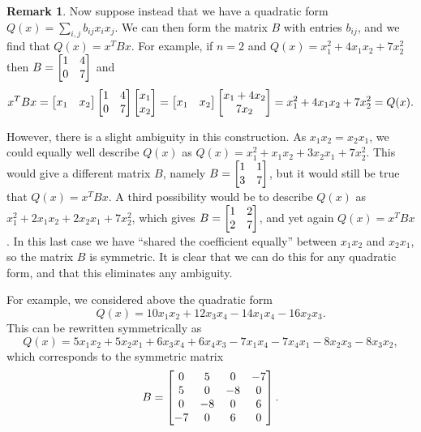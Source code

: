 \documentclass[reqno]{amsart}
\theoremstyle{definition}
\newtheorem{remark}[theorem]{Remark}
\begin{document}
\begin{remark}\label{rem-quadratic-symmetrise}
 Now suppose instead that we have a quadratic form
 $Q(x)=\sum_{i,j}b_{ij}x_ix_j$.  We can then form the matrix $B$ with
 entries $b_{ij}$, and we find that $Q(x)=x^TBx$.  For example, if
 $n=2$ and $Q(x)=x_1^2+4x_1x_2+7x_2^2$ then $B=\left[\begin{matrix} 1&4\\ 0&7\end{matrix}\right]$ and
 \[ x^TBx
    = \left[\begin{matrix} x_1&x_2\end{matrix}\right] \left[\begin{matrix} 1&4\\ 0&7\end{matrix}\right] \left[\begin{matrix} x_1\\ x_2\end{matrix}\right] 
    = \left[\begin{matrix} x_1&x_2\end{matrix}\right] \left[\begin{matrix} x_1+4x_2 \\ 7x_2 \end{matrix}\right] 
    = x_1^2 + 4x_1x_2 + 7x_2^2
    = Q(x).
 \]

 However, there is a slight ambiguity in this construction.  As
 $x_1x_2=x_2x_1$, we could equally well describe $Q(x)$ as 
 $Q(x)=x_1^2+x_1x_2+3x_2x_1+7x_2^2$.  This would give a different
 matrix $B$, namely $B=\left[\begin{matrix} 1&1\\ 3&7\end{matrix}\right]$, but it would still be true
 that $Q(x)=x^TBx$.  A third possibility would be to describe $Q(x)$
 as $x_1^2+2x_1x_2+2x_2x_1+7x_2^2$, which gives $B=\left[\begin{matrix} 1&2\\2&7\end{matrix}\right]$,
 and yet again $Q(x)=x^TBx$.  In this last case we have ``shared the
 coefficient equally'' between $x_1x_2$ and $x_2x_1$, so the matrix
 $B$ is symmetric.  It is clear that we can do this for any quadratic
 form, and that this eliminates any ambiguity.  

 For example, we considered above the quadratic form
 \[ Q(x)=10x_1x_2+12x_3x_4-14x_1x_4-16x_2x_3. \]
 This can be rewritten symmetrically as 
 \[ Q(x) = 
      5 x_1x_2 + 5 x_2x_1 
    + 6 x_3x_4 + 6 x_4x_3  
    - 7 x_1x_4 - 7 x_4x_1
    - 8 x_2x_3 - 8 x_3x_2,
 \]
 which corresponds to the symmetric matrix
 \[ B = \left[\begin{matrix}
     0 &  5 &  0 & -7 \\
     5 &  0 & -8 &  0 \\
     0 & -8 &  0 &  6 \\
    -7 &  0 &  6 &  0
    \end{matrix}\right].
 \]
\end{remark}
\end{document}
